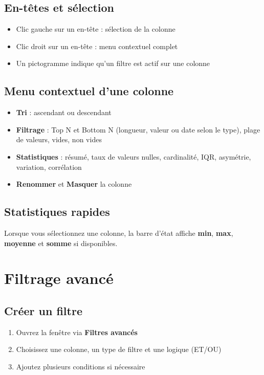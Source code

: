 \documentclass[11pt, a4paper]{article}
\begin{document}
\subsection{En-têtes et sélection}
\begin{itemize}
    \item Clic gauche sur un en-tête : sélection de la colonne
    \item Clic droit sur un en-tête : menu contextuel complet
    \item Un pictogramme indique qu'un filtre est actif sur une colonne
\end{itemize}

\subsection{Menu contextuel d'une colonne}
\begin{itemize}
    \item \textbf{Tri} : ascendant ou descendant
    \item \textbf{Filtrage} : Top N et Bottom N (longueur, valeur ou date selon le type), plage de valeurs, vides, non vides
    \item \textbf{Statistiques} : résumé, taux de valeurs nulles, cardinalité, IQR, asymétrie, variation, corrélation
    \item \textbf{Renommer} et \textbf{Masquer} la colonne
\end{itemize}

\subsection{Statistiques rapides}
Lorsque vous sélectionnez une colonne, la barre d'état affiche \textbf{min}, \textbf{max}, \textbf{moyenne} et \textbf{somme} si disponibles.

\section{Filtrage avancé}

\subsection{Créer un filtre}
\begin{enumerate}
    \item Ouvrez la fenêtre via \textbf{Filtres avancés}
    \item Choisissez une colonne, un type de filtre et une logique (ET/OU)
    \item Ajoutez plusieurs conditions si nécessaire
\end{enumerate}
\end{document}
